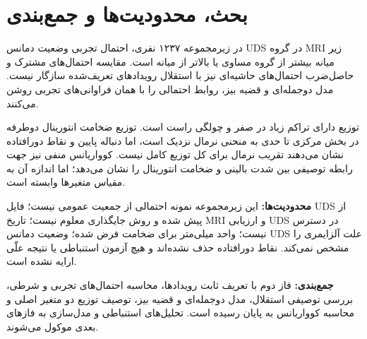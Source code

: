 \documentclass[a4paper,11pt]{article}
\newcommand{\Code}[1]{\lr{\texttt{\detokenize{#1}}}}
\newcommand{\En}[1]{\lr{#1}}
\begin{document}
\section{بحث، محدودیت‌ها و جمع‌بندی}
در زیرمجموعه ۱۲۳۷ نفری، احتمال تجربی وضعیت دمانس UDS در گروه MRI زیر میانه بیشتر از گروه
مساوی یا بالاتر از میانه است. مقایسه احتمال‌های مشترک و حاصل‌ضرب احتمال‌های حاشیه‌ای نیز
با استقلال رویدادهای تعریف‌شده سازگار نیست. مدل دوجمله‌ای و قضیه بیز، روابط احتمالی را با
همان فراوانی‌های تجربی روشن می‌کنند.

توزیع \Code{CDRSUM} دارای تراکم زیاد در صفر و چولگی راست است. توزیع ضخامت انتورینال دوطرفه
در بخش مرکزی تا حدی به منحنی نرمال نزدیک است، اما دنباله پایین و نقاط دورافتاده نشان می‌دهند
تقریب نرمال برای کل توزیع کامل نیست. کوواریانس منفی نیز جهت رابطه توصیفی بین شدت بالینی و
ضخامت انتورینال را نشان می‌دهد؛ اما اندازه آن به مقیاس متغیرها وابسته است.

\textbf{محدودیت‌ها:} این زیرمجموعه نمونه احتمالی از جمعیت عمومی نیست؛ فایل UDS از پیش
\En{imputed} شده و روش جایگذاری معلوم نیست؛ تاریخ MRI و ارزیابی UDS در دسترس نیست؛ واحد
میلی‌متر برای ضخامت فرض شده؛ وضعیت دمانس UDS علت آلزایمری را مشخص نمی‌کند. نقاط دورافتاده
حذف نشده‌اند و هیچ آزمون استنباطی یا نتیجه علّی ارایه نشده است.

\textbf{جمع‌بندی:} فاز دوم با تعریف ثابت رویدادها، محاسبه احتمال‌های تجربی و شرطی، بررسی
توصیفی استقلال، مدل دوجمله‌ای و قضیه بیز، توصیف توزیع دو متغیر اصلی و محاسبه کوواریانس
به پایان رسیده است. تحلیل‌های استنباطی و مدل‌سازی به فازهای بعدی موکول می‌شوند.
\end{document}
